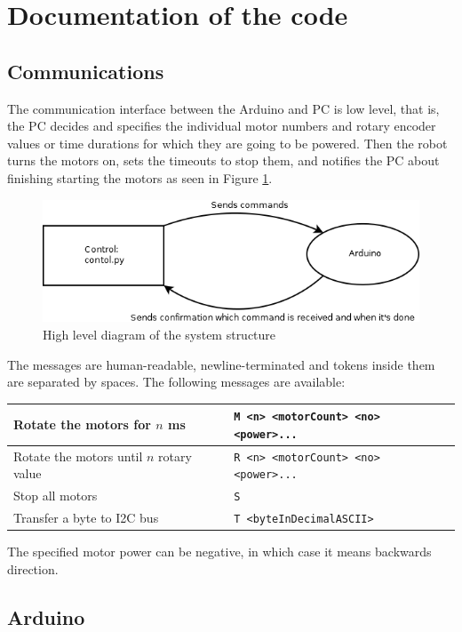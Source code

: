 \documentclass[12pt]{article}
\begin{document}
\section{Documentation of the code}

\subsection{Communications}

The communication interface between the Arduino and PC is low level, that is,
the PC decides and specifies the individual motor numbers and rotary encoder
values or time durations for which they are going to be powered. Then the robot
turns the motors on, sets the timeouts to stop them, and notifies the PC about
finishing starting the motors as seen in Figure \ref{fig:code1}.

\begin{figure}
    \includegraphics[scale=.7]{Diagram2}
    \caption{High level diagram of the system structure}
    \label{fig:code1}
\end{figure}

The messages are human-readable, newline-terminated and tokens inside them are
separated by spaces. The following messages are available:

\begin{tabular}{ | l | l | }
    \hline
    Rotate the motors for $n$ ms &
    \texttt{M <n> <motorCount> <no> <power>...} \\ \hline
    Rotate the motors until $n$ rotary value &
    \texttt{R <n> <motorCount> <no> <power>...} \\ \hline
    Stop all motors &
    \texttt{S} \\ \hline
    Transfer a byte to I2C bus &
    \texttt{T <byteInDecimalASCII>} \\ \hline
\end{tabular}

The specified motor power can be negative, in which case it means backwards
direction.

\subsection{Arduino}
\end{document}
